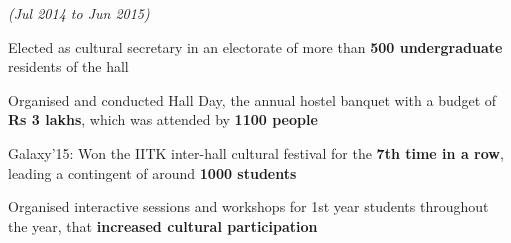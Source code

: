 \documentclass[a4paper]{deedy-resume} %
\begin{document}
\microspace
{}
\hfill {\textit{\small(Jul 2014 to Jun 2015)}}\\
\begin{tightitemize}
\item Elected as cultural secretary in an electorate of more than \textbf{500 undergraduate} residents of the hall
\item Organised and conducted Hall Day, the annual hostel banquet with a budget of \textbf{Rs 3 lakhs}, which was attended by \textbf{1100 people}
\item Galaxy'15: Won the IITK inter-hall cultural festival for the \textbf{7th time in a row}, leading a contingent of around \textbf{1000 students}
\item Organised interactive sessions and workshops for 1st year students throughout the year, that \textbf{increased cultural participation}
\end{tightitemize}




\end{document}
